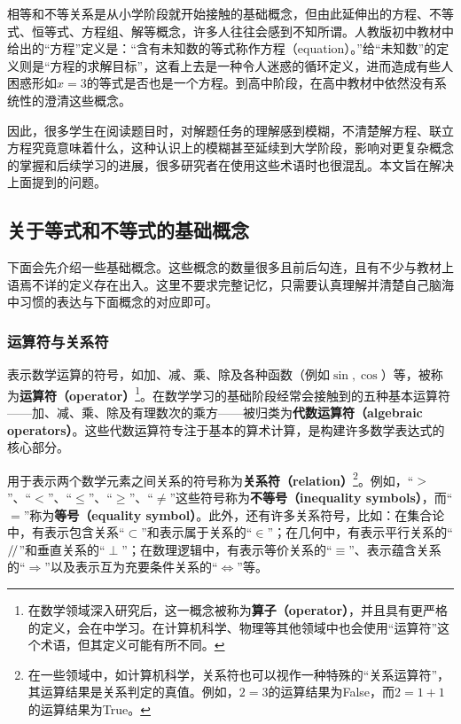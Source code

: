 
\begin{issues}
\issueDraft
\end{issues}


相等和不等关系是从小学阶段就开始接触的基础概念，但由此延伸出的方程、不等式、恒等式、方程组、解等概念，许多人往往会感到不知所谓。人教版初中教材中给出的“方程”定义是：“含有未知数的等式称作方程（equation）。”给“未知数”的定义则是“方程的求解目标”，这看上去是一种令人迷惑的循环定义，进而造成有些人困惑形如$x=3$的等式是否也是一个方程。到高中阶段，在高中教材中依然没有系统性的澄清这些概念。

因此，很多学生在阅读题目时，对解题任务的理解感到模糊，不清楚解方程、联立方程究竟意味着什么，这种认识上的模糊甚至延续到大学阶段，影响对更复杂概念的掌握和后续学习的进展，很多研究者在使用这些术语时也很混乱。本文旨在解决上面提到的问题。

\subsection{关于等式和不等式的基础概念}

下面会先介绍一些基础概念。这些概念的数量很多且前后勾连，且有不少与教材上语焉不详的定义存在出入。这里不要求完整记忆，只需要认真理解并清楚自己脑海中习惯的表达与下面概念的对应即可。

\subsubsection{运算符与关系符}

表示数学运算的符号，如加、减、乘、除及各种函数（例如$\sin,\cos$）等，被称为\textbf{运算符（operator）}\footnote{在数学领域深入研究后，这一概念被称为\textbf{算子（operator）}，并且具有更严格的定义，会在中学习。在计算机科学、物理等其他领域中也会使用“运算符”这个术语，但其定义可能有所不同。}。在数学学习的基础阶段经常会接触到的五种基本运算符——加、减、乘、除及有理数次的乘方——被归类为\textbf{代数运算符（algebraic operators）}。这些代数运算符专注于基本的算术计算，是构建许多数学表达式的核心部分。

用于表示两个数学元素之间关系的符号称为\textbf{关系符（relation）}\footnote{在一些领域中，如计算机科学，关系符也可以视作一种特殊的“关系运算符”，其运算结果是关系判定的真值。例如，$2=3$的运算结果为False，而$2=1+1$的运算结果为True。}。例如，“$>$”、“$<$”、“$\leq$”、“$\geq$”、“$\neq$”这些符号称为\textbf{不等号（inequality symbols）}，而“$=$”称为\textbf{等号（equality symbol）}。此外，还有许多关系符号，比如：在集合论中，有表示包含关系“$\subset$”和表示属于关系的“$\in$”；在几何中，有表示平行关系的“$\mathrel{/\mskip-2.5mu/}$”和垂直关系的“$\perp$”；在数理逻辑中，有表示等价关系的“$\equiv$”、表示蕴含关系的“$\Rightarrow$”以及表示互为充要条件关系的“$\iff$”等。

